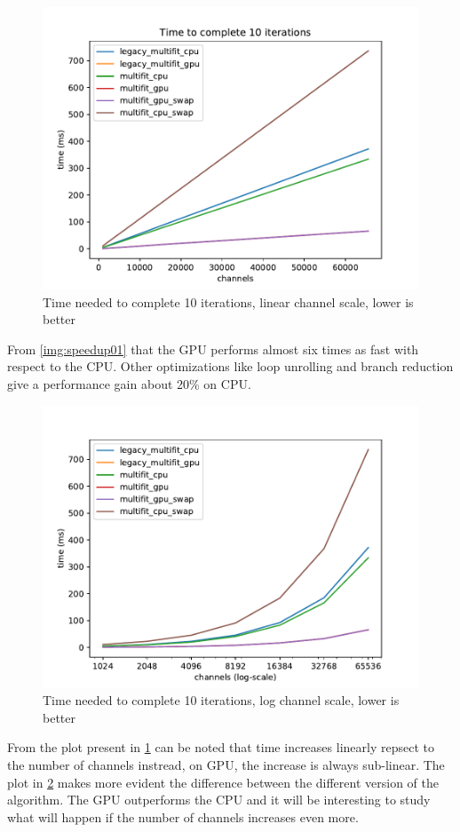 \begin{figure}[H]
  \includegraphics[width=.75\textwidth]{img/linscale}
  \caption{Time needed to complete 10 iterations, linear channel scale, lower is better}
  \label{img:linscale01}
\end{figure}
From \ref{img:speedup01} that the GPU performs almost six times as fast with respect to the CPU. Other optimizations like loop unrolling and branch reduction give a performance gain about 20\% on CPU.
\begin{figure}[H]
  \includegraphics[width=.75\textwidth]{img/logscale}
  \caption{Time needed to complete 10 iterations, log channel scale, lower is better}
  \label{img:logscale01}
\end{figure}
From the plot present in \ref{img:linscale01} can be noted that time increases linearly repsect to the number of channels instread, on GPU, the increase is always sub-linear.
The plot in \ref{img:logscale01} makes more evident the difference between the different version of the algorithm. The GPU outperforms the CPU and it will be interesting to study what will happen if the number of channels increases even more.\\
